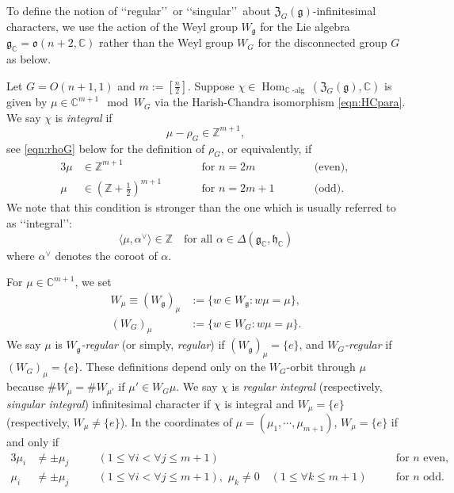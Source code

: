 To define the notion of \lq\lq{regular}\rq\rq\
 or \lq\lq{singular}\rq\rq\
 about ${\mathfrak{Z}}_G({\mathfrak{g}})$-infinitesimal characters, 
 we use the action of the Weyl group $W_{\mathfrak{g}}$
 for the Lie algebra 
 ${\mathfrak{g}}_{\mathbb{C}}={\mathfrak{o}}(n+2,{\mathbb{C}})$
 rather than the Weyl group $W_G$
 for the disconnected group $G$ as below.  
 
\begin{definition}
\label{def:intreg}
Let $G=O(n+1,1)$ and $m:=[\frac n 2]$.  
Suppose $\chi\in {\operatorname{Hom}}_{{\mathbb{C}}\operatorname{-alg}}({\mathfrak{Z}}_G({\mathfrak{g}}), {{\mathbb{C}}})$
 is given by $\mu \in {\mathbb{C}}^{m+1} \mod W_G$ 
 via the Harish-Chandra isomorphism \eqref{eqn:HCpara}.  
We say $\chi$ is {\it{integral}}
 if 
\[
  \mu -\rho_G \in {\mathbb{Z}}^{m+1}, 
\]
see \eqref{eqn:rhoG} below
 for the definition of $\rho_G$, 
 or equivalently,
 if 
\begin{alignat*}{3}
\mu &\in {\mathbb{Z}}^{m+1}
\qquad
&&
\text{for $n=2m$}
\qquad
&&
\text{(even), }
\\
\mu &\in ({\mathbb{Z}}+\frac 1 2)^{m+1}
\qquad
&&
\text{for $n=2m+1$}
\qquad
&&
\text
{(odd).  }
\end{alignat*}
We note that this condition is stronger
 than the one which is usually referred
 to as \lq\lq{integral}\rq\rq:
\[
   \langle \mu, \alpha^{\vee} \rangle \in {\mathbb{Z}}
   \quad
  \text{for all $\alpha \in \Delta({\mathfrak{g}}_{\mathbb{C}}, {\mathfrak{h}}_{\mathbb{C}})$}
\]
where  $\alpha^{\vee}$ denotes the coroot of $\alpha$.  

For $\mu \in {\mathbb{C}}^{m+1}$, 
 we set 
\begin{align*}
  W_{\mu} \equiv (W_{\mathfrak{g}})_{\mu} 
          &:=\{w \in W_{\mathfrak{g}}: w \mu =\mu \}, 
\\
(W_G)_{\mu} 
          &:=\{w \in W_G: w \mu =\mu \}.  
\end{align*}
We say $\mu$ is 
{\it{$W_{\mathfrak{g}}$-regular}}
 (or simply, {\it{regular}})
 if $(W_{\mathfrak{g}})_{\mu}=\{e\}$, 
 and 
{\it{$W_G$-regular}}
 if $(W_G)_{\mu}=\{e\}$.  
These definitions depend only
 on the $W_G$-orbit through $\mu$ 
 because $\# W_{\mu}= \# W_{\mu'}$ if $\mu' \in W_G \mu$.  
We say $\chi$ is 
 {\it{regular integral}}
 (respectively, 
{\it{singular integral}}) 
 infinitesimal character
 if $\chi$ is integral
 and $W_{\mu}=\{e\}$
 (respectively, $W_{\mu}\ne \{e\}$).  
In the coordinates of $\mu=(\mu_1, \cdots, \mu_{m+1})$, 
 $W_{\mu}=\{e\}$
 if and only if 
\begin{alignat*}{3}
\mu_i &\ne \pm \mu_j 
\quad
&&(1 \le \forall i < \forall j \le m+1)
&&\text{for $n$ even}, 
\\
\mu_i &\ne \pm \mu_j 
&&(1 \le \forall i < \forall j \le m+1), 
\,\,
\mu_k \ne 0
\quad
(1 \le \forall k \le m+1)
\quad
&&\text{for $n$ odd}.  
\end{alignat*}
\end{definition}

